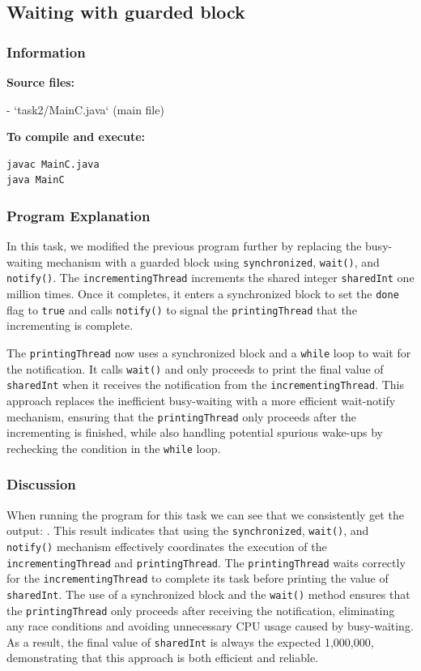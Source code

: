 \documentclass{article}
\begin{document}
\subsection{Waiting with guarded block} \label{GuardBlock}

\subsubsection{Information}
\textbf{Source files:}

- `task2/MainC.java` (main file)

\textbf{To compile and execute:}
\begin{lstlisting}[style=bash]
javac MainC.java
java MainC
\end{lstlisting}

\subsubsection{Program Explanation}
In this task, we modified the previous program further by replacing the busy-waiting mechanism with a guarded block using \texttt{synchronized}, \texttt{wait()}, and \texttt{notify()}. The \texttt{incrementingThread} increments the shared integer \texttt{sharedInt} one million times. Once it completes, it enters a synchronized block to set the \texttt{done} flag to \texttt{true} and calls \texttt{notify()} to signal the \texttt{printingThread} that the incrementing is complete.

The \texttt{printingThread} now uses a synchronized block and a \texttt{while} loop to wait for the notification. It calls \texttt{wait()} and only proceeds to print the final value of \texttt{sharedInt} when it receives the notification from the \texttt{incrementingThread}. This approach replaces the inefficient busy-waiting with a more efficient wait-notify mechanism, ensuring that the \texttt{printingThread} only proceeds after the incrementing is finished, while also handling potential spurious wake-ups by rechecking the condition in the \texttt{while} loop.

\subsubsection{Discussion}
When running the program for this task we can see that we consistently get the output: . This result indicates that using the \texttt{synchronized}, \texttt{wait()}, and \texttt{notify()} mechanism effectively coordinates the execution of the \texttt{incrementingThread} and \texttt{printingThread}. The \texttt{printingThread} waits correctly for the \texttt{incrementingThread} to complete its task before printing the value of \texttt{sharedInt}. The use of a synchronized block and the \texttt{wait()} method ensures that the \texttt{printingThread} only proceeds after receiving the notification, eliminating any race conditions and avoiding unnecessary CPU usage caused by busy-waiting. As a result, the final value of \texttt{sharedInt} is always the expected 1,000,000, demonstrating that this approach is both efficient and reliable.
\end{document}
